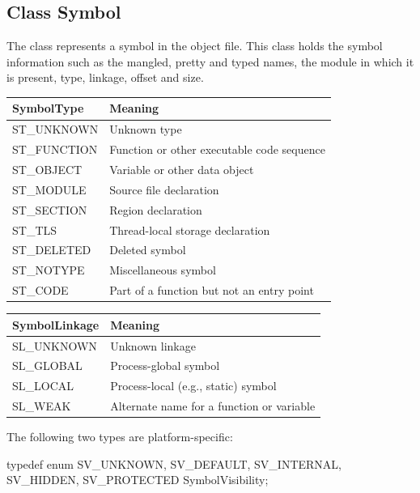 \subsection{Class Symbol}


The  class represents a symbol in the object file. This class holds the symbol information such as the mangled, pretty and typed names, the module in which it is present, type, linkage, offset and size.


\begin{center}
\begin{tabular}{ll}
\toprule
SymbolType & Meaning \\
\midrule
ST\_UNKNOWN & Unknown type \\
ST\_FUNCTION & Function or other executable code sequence \\
ST\_OBJECT & Variable or other data object \\
ST\_MODULE & Source file declaration \\
ST\_SECTION & Region declaration \\
ST\_TLS & Thread-local storage declaration \\
ST\_DELETED & Deleted symbol \\
ST\_NOTYPE & Miscellaneous symbol \\
ST\_CODE & Part of a function but not an entry point \\
\bottomrule
\end{tabular}
\end{center}


\begin{center}
\begin{tabular}{ll}
\toprule
SymbolLinkage & Meaning \\
\midrule
SL\_UNKNOWN & Unknown linkage \\
SL\_GLOBAL & Process-global symbol \\
SL\_LOCAL & Process-local (e.g., static) symbol \\
SL\_WEAK & Alternate name for a function or variable \\
\bottomrule
\end{tabular}
\end{center}

The following two types are platform-specific:

\begin{apient}
typedef enum {
    SV_UNKNOWN,
    SV_DEFAULT,
    SV_INTERNAL,
    SV_HIDDEN,
    SV_PROTECTED
} SymbolVisibility;
\end{apient}


